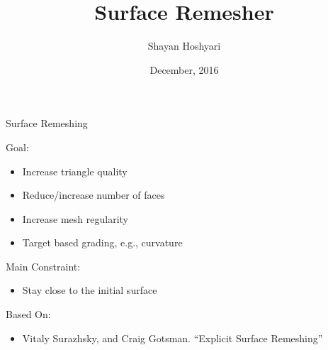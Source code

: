 \documentclass{beamer}
\title{Surface Remesher}
\author{Shayan Hoshyari}
\institute[University of British Columbia]{}
\date{December, 2016}
\begin{document}
\begin{frame}[plain]
  \titlepage
\end{frame}



\begin{frame}[plain]{Surface Remeshing}
  
  Goal:
  \begin{itemize}
  \item \alert<2>{ Increase triangle quality       }
  \item \alert<2>{ Reduce/increase number of faces }
  \item Increase mesh regularity  
  \item Target based grading, e.g., curvature
  \end{itemize}

  \vspace{0.5cm}
  
  Main Constraint:
  \begin{itemize}
  \item \alert<2>{ Stay close to the initial surface }
  \end{itemize}

  \vspace{0.5cm}
  
  Based On:
  
  \begin{itemize}
    \item Vitaly Surazhsky, and Craig Gotsman. ``Explicit Surface Remeshing''
  \end{itemize}

\end{frame}
\end{document}
